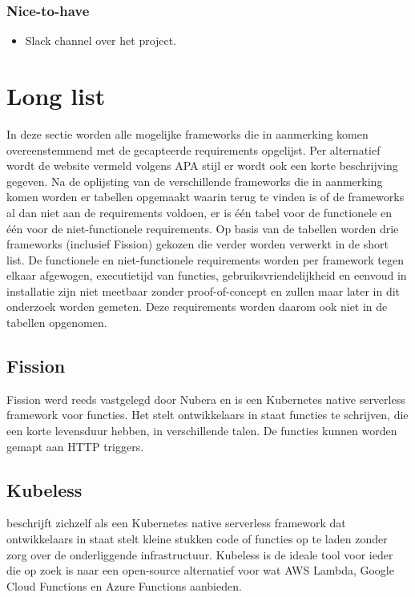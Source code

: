 \subsubsection{Nice-to-have}
\begin{itemize}
    \item Slack channel over het project.
\end{itemize}

\section{Long list}
In deze sectie worden alle mogelijke frameworks die in aanmerking komen overeenstemmend met de gecapteerde requirements opgelijst. Per alternatief wordt de website vermeld volgens APA stijl er wordt ook een korte beschrijving gegeven. Na de oplijsting van de verschillende frameworks die in aanmerking komen worden er tabellen opgemaakt waarin terug te vinden is of de frameworks al dan niet aan de requirements voldoen, er is één tabel voor de functionele en één voor de niet-functionele requirements. Op basis van de tabellen worden drie frameworks (inclusief Fission) gekozen die verder worden verwerkt in de short list. De functionele en niet-functionele requirements worden per framework tegen elkaar afgewogen, executietijd van functies, gebruiksvriendelijkheid en eenvoud in installatie zijn niet meetbaar zonder proof-of-concept en zullen maar later in dit onderzoek worden gemeten. Deze requirements worden daarom ook niet in de tabellen opgenomen.

\subsection{Fission}
Fission werd reeds vastgelegd door Nubera en is een Kubernetes native serverless framework voor functies. Het stelt ontwikkelaars in staat functies te schrijven, die een korte levensduur hebben, in verschillende talen. De functies kunnen worden gemapt aan HTTP triggers. \autocite{Fission2019}

\subsection{Kubeless}
\textcite{Kubeless2019} beschrijft zichzelf als een Kubernetes native serverless framework dat ontwikkelaars in staat stelt kleine stukken code of functies op te laden zonder zorg over de onderliggende infrastructuur. Kubeless is de ideale tool voor ieder die op zoek is naar een open-source alternatief voor wat AWS Lambda, Google Cloud Functions en Azure Functions aanbieden.


